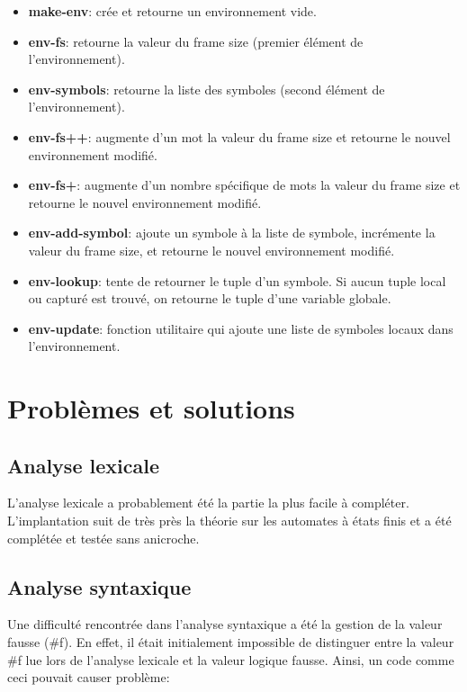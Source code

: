 \documentclass[11pt]{report}
\begin{document}
\begin{itemize}
\item {\bf make-env}: crée et retourne un environnement vide.
\item {\bf env-fs}: retourne la valeur du frame size (premier élément
  de l'environnement).
\item {\bf env-symbols}: retourne la liste des symboles (second
  élément de l'environnement).
\item {\bf env-fs++}: augmente d'un mot la valeur du frame size et
  retourne le nouvel environnement modifié.
\item {\bf env-fs+}: augmente d'un nombre spécifique de mots la valeur
  du frame size et retourne le nouvel environnement modifié.
\item {\bf env-add-symbol}: ajoute un symbole à la liste de symbole,
  incrémente la valeur du frame size, et retourne le nouvel
  environnement modifié.
\item {\bf env-lookup}: tente de retourner le tuple d'un symbole.  Si
  aucun tuple local ou capturé est trouvé, on retourne le tuple d'une
  variable globale.
\item {\bf env-update}: fonction utilitaire qui ajoute une liste de
  symboles locaux dans l'environnement.
\end{itemize}



\chapter{Problèmes et solutions}

\section{Analyse lexicale}

L'analyse lexicale a probablement été la partie la plus facile à
compléter. L'implantation suit de très près la théorie sur les
automates à états finis et a été complétée et testée sans anicroche.

\section{Analyse syntaxique}

Une difficulté rencontrée dans l'analyse syntaxique a été la gestion
de la valeur fausse (\#f).  En effet, il était initialement impossible
de distinguer entre la valeur \#f lue lors de l'analyse lexicale et la
valeur logique fausse.  Ainsi, un code comme ceci pouvait causer
problème:
\end{document}
